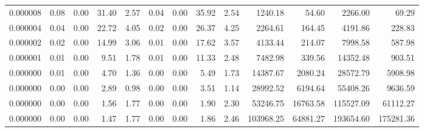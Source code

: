 \begin{tabular}{lrrrrrrrrrrrr}
0.000008 & 0.08 & 0.00 & 31.40 & 2.57 & 0.04 & 0.00 & 35.92 & 2.54 & 1240.18 & 54.60 & 2266.00 & 69.29 \\
0.000004 & 0.04 & 0.00 & 22.72 & 4.05 & 0.02 & 0.00 & 26.37 & 4.25 & 2264.61 & 164.45 & 4191.86 & 228.83 \\
0.000002 & 0.02 & 0.00 & 14.99 & 3.06 & 0.01 & 0.00 & 17.62 & 3.57 & 4133.44 & 214.07 & 7998.58 & 587.98 \\
0.000001 & 0.01 & 0.00 & 9.51 & 1.78 & 0.01 & 0.00 & 11.33 & 2.48 & 7482.98 & 339.56 & 14352.48 & 903.51 \\
0.000000 & 0.01 & 0.00 & 4.70 & 1.36 & 0.00 & 0.00 & 5.49 & 1.73 & 14387.67 & 2080.24 & 28572.79 & 5908.98 \\
0.000000 & 0.00 & 0.00 & 2.89 & 0.98 & 0.00 & 0.00 & 3.51 & 1.14 & 28992.52 & 6194.64 & 55408.26 & 9636.59 \\
0.000000 & 0.00 & 0.00 & 1.56 & 1.77 & 0.00 & 0.00 & 1.90 & 2.30 & 53246.75 & 16763.58 & 115527.09 & 61112.27 \\
0.000000 & 0.00 & 0.00 & 1.47 & 1.77 & 0.00 & 0.00 & 1.86 & 2.46 & 103968.25 & 64881.27 & 193654.60 & 175281.36 \\
\bottomrule
\end{tabular}
